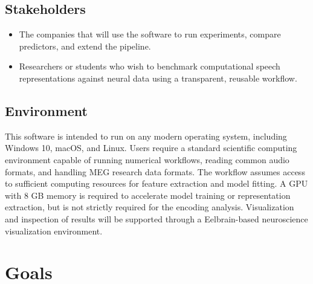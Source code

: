 \documentclass{article}
\begin{document}
\subsection{Stakeholders}

\begin{itemize}

\item The companies that will use the software to run experiments, compare predictors, and extend the pipeline.

\item Researchers or students who wish to benchmark computational speech representations against neural data using a transparent, reusable workflow.

\end{itemize}



\subsection{Environment}


This software is intended to run on any modern operating system, including
Windows 10, macOS, and Linux. Users require a standard scientific
computing environment capable of running numerical workflows, reading common
audio formats, and handling MEG research data formats. 
The workflow assumes
access to sufficient computing resources for feature extraction and model fitting.
A GPU with 8 GB memory is required to accelerate model training or representation
extraction, but is not strictly required for the encoding analysis.
Visualization and inspection of results will be supported through a
Eelbrain-based neuroscience visualization environment.

\section{Goals}
\end{document}
